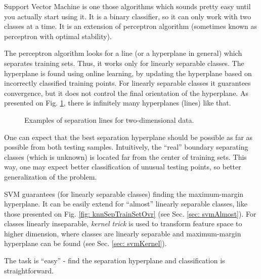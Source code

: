 Support Vector Machine is one those algorithms which sounds pretty easy until you actually start using it. It is a binary classifier, so it can only work with two classes at a time. It is an extension of perceptron algorithm (sometimes known as perceptron with optimal stability). 

The perceptron algorithm looks for a line (or a hyperplane in general) which separates training sets. Thus, it works only for linearly separable classes. The hyperplane is found using online learning, by updating the hyperplane based on incorrectly classified training points. For linearly separable classes it guarantees convergence, but it does not control the final orientation of the hyperplane. As presented on Fig. \ref{fig: perceptron}, there is infinitely many hyperplanes (lines) like that.

\begin{figure}
  \centering
  \caption{Examples of separation lines for two-dimensional data.}
  \label{fig: perceptron}
\end{figure}

One can expect that the best separation hyperplane should be possible as far as possible from both testing samples. Intuitively, the ``real'' boundary separating classes (which is unknown) is located far from the center of training sets. This way, one may expect better classification of unusual testing points, so better generalization of the problem.

SVM guarantees (for linearly separable classes) finding the maximum-margin hyperplane. It can be easily extend for ``almost'' linearly separable classes, like those presented on Fig. \ref{fig: knnSepTrainSetOvr} (see Sec. \ref{sec: svmAlmost}). For classes linearly inseparable, {\it kernel trick} is used to transform feature space to higher dimension, where classes are linearly separable and maximum-margin hyperplane can be found (see Sec. \ref{sec: svmKernel}).

The task is ``easy'' - find the separation hyperplane and classification is straightforward.